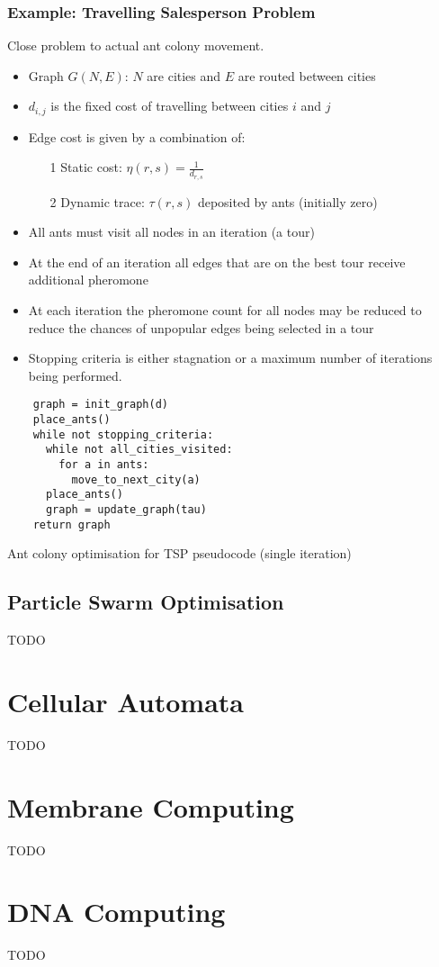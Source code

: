 \documentclass[a4paper]{article}
\begin{document}
\subsubsection{Example: Travelling Salesperson Problem}

Close problem to actual ant colony movement.

\begin{itemize}
  \item Graph $G(N, E)$: $N$ are cities and $E$ are routed between cities
  \item $d_{i,j}$ is the fixed cost of travelling between cities $i$ and $j$
  \item Edge cost is given by a combination of:
    \begin{enumerate}
      \item[1] Static cost: $\eta(r, s) = \frac{1}{d_{r,s}}$
      \item[2] Dynamic trace: $\tau(r, s)$ deposited by ants (initially zero)
    \end{enumerate}
  \item All ants must visit all nodes in an iteration (a tour)
  \item At the end of an iteration all edges that are on the best tour receive
        additional pheromone
  \item At each iteration the pheromone count for all nodes may be reduced to
        reduce the chances of unpopular edges being selected in a tour
  \item Stopping criteria is either stagnation or a maximum number of iterations
    being performed.
\end{itemize}


\begin{listing}[h]
  \begin{verbatim}
    graph = init_graph(d)
    place_ants()
    while not stopping_criteria:
      while not all_cities_visited:
        for a in ants:
          move_to_next_city(a)
      place_ants()
      graph = update_graph(tau)
    return graph
  \end{verbatim}
  \caption{Ant colony optimisation for TSP pseudocode (single iteration)}
  \label{listing:msco_for_tsp_pseudocode}
\end{listing}
\FloatBarrier

\subsection{Particle Swarm Optimisation}

TODO

\section{Cellular Automata}
\label{sec:ca}

TODO

\section{Membrane Computing}
\label{sec:membrane}

TODO

\section{DNA Computing}
\label{sec:dna}

TODO
\end{document}

